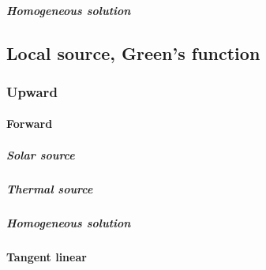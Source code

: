 \subparagraph{Homogeneous solution}
\label{sec:source_function_integration-local_source_classical-downward-adjoint_of_tanget_linear-homogeneous_solution}


%
\subsection{Local source, Green's function}
\label{sec:source_function_integration-local_source_greens_function}


%
\subsubsection{Upward}
\label{sec:source_function_integration-local_source_greens_function-upward}


%
\paragraph{Forward}
\label{sec:source_function_integration-local_source_greens_function-upward-forward}


\subparagraph{Solar source}
\label{sec:source_function_integration-local_source_greens_function-upward-forward-solar_source}


\subparagraph{Thermal source}
\label{sec:source_function_integration-local_source_greens_function-upward-forward-thermal_source}


\subparagraph{Homogeneous solution}
\label{sec:source_function_integration-local_source_greens_function-upward-forward-homogeneous_solution}


%
\paragraph{Tangent linear}
\label{sec:source_function_integration-local_source_greens_function-upward-tangent_linear}

